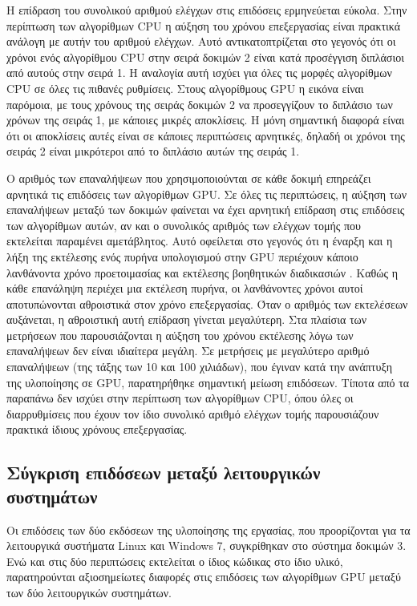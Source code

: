 Η επίδραση του συνολικού αριθμού ελέγχων στις επιδόσεις ερμηνεύεται εύκολα. Στην περίπτωση των αλγορίθμων CPU η αύξηση του χρόνου επεξεργασίας είναι πρακτικά ανάλογη με αυτήν του αριθμού ελέγχων. Αυτό αντικατοπτρίζεται στο γεγονός ότι οι χρόνοι ενός αλγορίθμου CPU στην σειρά δοκιμών 2 είναι κατά προσέγγιση διπλάσιοι από αυτούς στην σειρά 1. Η αναλογία αυτή ισχύει για όλες τις μορφές αλγορίθμων CPU σε όλες τις πιθανές ρυθμίσεις. Στους αλγορίθμους GPU η εικόνα είναι παρόμοια, με τους χρόνους της σειράς δοκιμών 2 να προσεγγίζουν το διπλάσιο των χρόνων της σειράς 1, με κάποιες μικρές αποκλίσεις. Η μόνη σημαντική διαφορά είναι ότι οι αποκλίσεις  αυτές είναι σε κάποιες περιπτώσεις αρνητικές, δηλαδή οι χρόνοι της σειράς 2 είναι μικρότεροι από το διπλάσιο αυτών της σειράς 1.

Ο αριθμός των επαναλήψεων που χρησιμοποιούνται σε κάθε δοκιμή επηρεάζει αρνητικά τις επιδόσεις των αλγορίθμων GPU. Σε όλες τις περιπτώσεις, η αύξηση των επαναλήψεων μεταξύ των δοκιμών φαίνεται να έχει αρνητική επίδραση στις επιδόσεις των αλγορίθμων αυτών, αν και ο συνολικός αριθμός των ελέγχων τομής που εκτελείται παραμένει αμετάβλητος. Αυτό οφείλεται στο γεγονός ότι η έναρξη και η λήξη της εκτέλεσης ενός πυρήνα υπολογισμού στην GPU περιέχουν κάποιο λανθάνοντα χρόνο προετοιμασίας και εκτέλεσης βοηθητικών διαδικασιών \cite{ATIOpenCL}. Καθώς η κάθε επανάληψη περιέχει μια εκτέλεση πυρήνα, οι λανθάνοντες χρόνοι αυτοί αποτυπώνονται αθροιστικά στον χρόνο επεξεργασίας. Όταν ο αριθμός των εκτελέσεων αυξάνεται, η αθροιστική αυτή επίδραση  γίνεται μεγαλύτερη. Στα πλαίσια των μετρήσεων που παρουσιάζονται η αύξηση του χρόνου εκτέλεσης λόγω των επαναλήψεων δεν είναι ιδιαίτερα μεγάλη. Σε μετρήσεις με μεγαλύτερο αριθμό επαναλήψεων (της τάξης των 10 και 100 χιλιάδων), που έγιναν κατά την ανάπτυξη της υλοποίησης σε GPU, 
παρατηρήθηκε σημαντική μείωση επιδόσεων. Τίποτα από τα παραπάνω δεν ισχύει στην περίπτωση των αλγορίθμων CPU, όπου όλες οι διαρρυθμίσεις που έχουν τον ίδιο συνολικό αριθμό ελέγχων τομής παρουσιάζουν πρακτικά ίδιους χρόνους επεξεργασίας.

\subsection{Σύγκριση επιδόσεων μεταξύ λειτουργικών συστημάτων}
\noindent Οι επιδόσεις των δύο εκδόσεων της υλοποίησης της εργασίας, που προορίζονται για τα λειτουργικά συστήματα Linux και Windows 7, συγκρίθηκαν στο σύστημα δοκιμών 3. Ενώ και στις δύο περιπτώσεις εκτελείται ο ίδιος κώδικας στο ίδιο υλικό, παρατηρούνται αξιοσημείωτες διαφορές στις επιδόσεις των αλγορίθμων GPU μεταξύ των δύο λειτουργικών συστημάτων.

